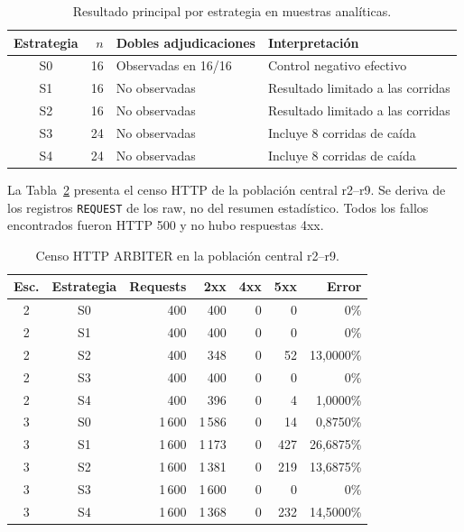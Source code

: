 \begin{table}[ht]
  \centering
  \small
  \caption{Resultado principal por estrategia en muestras analíticas.}
  \label{tab:arbiter-estrategias}
  \begin{tabular}{|c|r|l|l|}
    \hline
    \textbf{Estrategia} & \textbf{$n$} & \textbf{Dobles adjudicaciones} & \textbf{Interpretación} \\
    \hline
    S0 & 16 & Observadas en 16/16 & Control negativo efectivo \\
    \hline
    S1 & 16 & No observadas & Resultado limitado a las corridas \\
    \hline
    S2 & 16 & No observadas & Resultado limitado a las corridas \\
    \hline
    S3 & 24 & No observadas & Incluye 8 corridas de caída \\
    \hline
    S4 & 24 & No observadas & Incluye 8 corridas de caída \\
    \hline
  \end{tabular}
\end{table}

La Tabla~\ref{tab:arbiter-http} presenta el censo HTTP de la población central
r2--r9. Se deriva de los registros \texttt{REQUEST} de los raw, no del resumen
estadístico. Todos los fallos encontrados fueron HTTP 500 y no hubo respuestas
4xx.

\begin{table}[ht]
  \centering
  \scriptsize
  \caption{Censo HTTP ARBITER en la población central r2--r9.}
  \label{tab:arbiter-http}
  \begin{tabular}{|c|c|r|r|r|r|r|}
    \hline
    \textbf{Esc.} & \textbf{Estrategia} & \textbf{Requests} & \textbf{2xx} & \textbf{4xx} & \textbf{5xx} & \textbf{Error} \\
    \hline
    2 & S0 & 400 & 400 & 0 & 0 & 0\% \\
    2 & S1 & 400 & 400 & 0 & 0 & 0\% \\
    2 & S2 & 400 & 348 & 0 & 52 & 13,0000\% \\
    2 & S3 & 400 & 400 & 0 & 0 & 0\% \\
    2 & S4 & 400 & 396 & 0 & 4 & 1,0000\% \\
    \hline
    3 & S0 & 1\,600 & 1\,586 & 0 & 14 & 0,8750\% \\
    3 & S1 & 1\,600 & 1\,173 & 0 & 427 & 26,6875\% \\
    3 & S2 & 1\,600 & 1\,381 & 0 & 219 & 13,6875\% \\
    3 & S3 & 1\,600 & 1\,600 & 0 & 0 & 0\% \\
    3 & S4 & 1\,600 & 1\,368 & 0 & 232 & 14,5000\% \\
    \hline
  \end{tabular}
\end{table}

